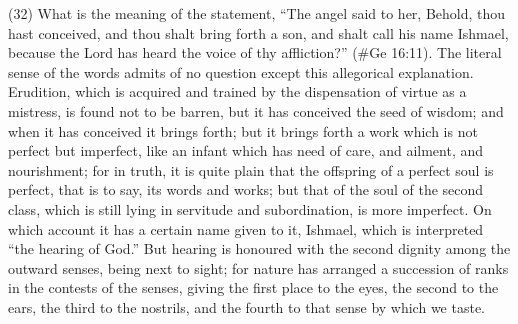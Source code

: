(32) What is the meaning of the statement, ``The angel said to her, Behold, thou hast conceived,
and thou shalt bring forth a son, and shalt call his name Ishmael, because the Lord has heard the
voice of thy affliction?'' (\#Ge 16:11). The literal sense of the words admits of no question
except this allegorical explanation. Erudition, which is acquired and trained by the dispensation of
virtue as a mistress, is found not to be barren, but it has conceived the seed of wisdom; and when
it has conceived it brings forth; but it brings forth a work which is not perfect but imperfect, like an
infant which has need of care, and ailment, and nourishment; for in truth, it is quite plain that the
offspring of a perfect soul is perfect, that is to say, its words and works; but that of the soul of the
second class, which is still lying in servitude and subordination, is more imperfect. On which
account it has a certain name given to it, Ishmael, which is interpreted ``the hearing of God.'' But
hearing is honoured with the second dignity among the outward senses, being next to sight; for
nature has arranged a succession of ranks in the contests of the senses, giving the first place to
the eyes, the second to the ears, the third to the nostrils, and the fourth to that sense by which we
taste.

